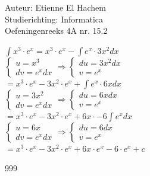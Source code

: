 \documentclass[a4paper]{article}
\begin{document}
  
\noindent \large Auteur: Etienne El Hachem \\
\noindent \large Studierichting: Informatica\\
\noindent \large Oefeningenreeks 4A nr. 15.2\\

\medskip

\normalsize

$\displaystyle\int x^3 \cdot e^x = x^3 \cdot e^x - \displaystyle\int e^x \cdot 3x^2 dx$ \\

$\left\{
   \begin{array}{l}
       u = x^3 \\
       dv = e^x dx
   \end{array}
\right.
\Rightarrow
\left\{
   \begin{array}{l}
       du = 3x^2 dx \\
       v = e^x
   \end{array}
\right.
$ \\

$= x^3 \cdot e^x - 3x^2 \cdot e^x + \displaystyle\int e^x \cdot 6x dx$ \\

$\left\{
   \begin{array}{l}
       u = 3x^2 \\
       dv = e^x dx
   \end{array}
\right.
\Rightarrow
\left\{
   \begin{array}{l}
       du = 6x dx \\
       v = e^x
   \end{array}
\right.
$ \\

$= x^3 \cdot e^x - 3x^2 \cdot e^x + 6x \cdot - 6 \displaystyle\int e^x dx$ \\

$\left\{
   \begin{array}{l}
       u = 6x \\
       dv = e^x dx
   \end{array}
\right.
\Rightarrow
\left\{
   \begin{array}{l}
       du = 6 dx \\
       v = e^x
   \end{array}
\right.
$ \\

$= x^3 \cdot e^x - 3x^2 \cdot e^x + 6x \cdot e^x - 6 \cdot e^x + c$

\begin{thebibliography}{999}
\end{thebibliography}
\end{document}
